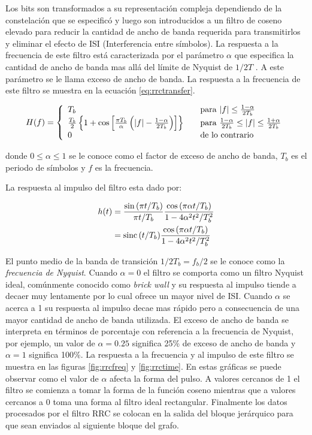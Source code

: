 Los bits son transformados a su representaci\'on compleja dependiendo de la constelaci\'on que se
especific\'o y luego son introducidos a un filtro de coseno elevado para
reducir la cantidad de ancho de banda requerida para transmitirlos y eliminar el efecto de ISI
(Interferencia entre s\'imbolos). La respuesta a la frecuencia de este filtro est\'a caracterizada
por el par\'ametro $\alpha$ que especifica la cantidad de ancho de banda mas all\'a del l\'imite de
Nyquist de $1/2T$ \cite{sklar}. A este par\'ametro se le llama exceso de ancho de banda. La
respuesta a la frecuencia de este filtro se muestra en la ecuaci\'on \eqref{eq:rrctransfer}.

\begin{equation}\label{eq:rrctransfer}
H(f)=\left\{
\begin{array}{l l}
T_b & \quad \text{para $|f| \leq \frac{1-\alpha}{2T_b}$}\\
\frac{T_b}{2}\left\{1+\cos{\left[\frac{\pi
T_b}{\alpha}\left(|f|-\frac{1-\alpha}{2T_b}\right)\right]}\right\} & \quad \text{para
$\frac{1-\alpha}{2T_b} \leq |f| \leq \frac{1+\alpha}{2T_b}$}\\ 0 & \quad \text{de lo contrario} 
\end{array}\right.
\end{equation}

donde $0 \leq \alpha \leq 1$ se le conoce como el factor de exceso de ancho de banda, $T_b$ es el
periodo de s\'imbolos y $f$ es la frecuencia. 

La respuesta al impulso del filtro esta dado por:

\begin{align}\label{eq:imptransfer}
h(t)&=\frac{\sin{(\pi t/T_b)}}{\pi t/T_b}\frac{\cos{(\pi\alpha t/T_b)}}{1-4\alpha^2t^2/T_b^2}
\nonumber \\ 
&=\operatorname{sinc}{(t/T_b)}\frac{\cos{(\pi \alpha t/T_b)}}{1-4\alpha^2t^2/T_b^2}
\end{align}

El punto medio de la banda de transici\'on $1/2T_b=f_b/2$ se le conoce como la \emph{frecuencia de
Nyquist}. Cuando $\alpha=0$ el filtro se comporta como un filtro Nyquist ideal, com\'unmente
conocido como \emph{brick wall} y su respuesta al impulso tiende a decaer muy lentamente por lo
cual ofrece un mayor nivel de ISI. Cuando $\alpha$ se acerca a 1 su respuesta al impulso decae mas
r\'apido pero a consecuencia de una mayor cantidad de ancho de banda utilizada. El exceso de ancho
de banda se interpreta en t\'erminos de porcentaje con referencia a la frecuencia de Nyquist, por
ejemplo, un valor de $\alpha=0.25$ significa 25\% de exceso de ancho de banda y $\alpha=1$
significa 100\%. La respuesta a la frecuencia y al impulso de este filtro se muestra en las figuras
\ref{fig:rrcfreq} y \ref{fig:rrctime}. En estas gr\'aficas se puede observar como el valor de $\alpha$ afecta la forma del
pulso. A valores cercanos de 1 el filtro se comienza a tomar la forma de la funci\'on coseno mientras que a valores
cercanos a 0 toma una forma al filtro ideal rectangular. Finalmente los datos procesados por el filtro RRC se colocan en la
salida del bloque jer\'arquico para que sean enviados al siguiente bloque del grafo.


